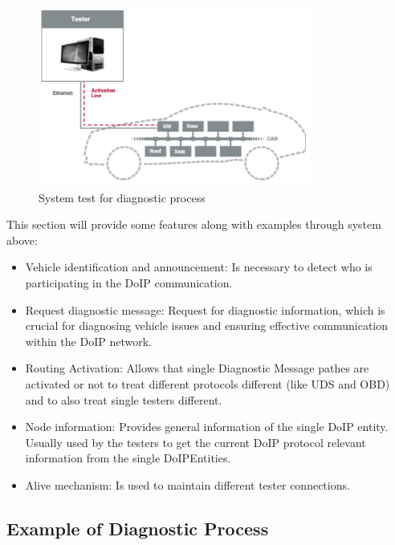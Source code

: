 \begin{figure}[htbp]
    \centering
    \includegraphics[width=0.8\textwidth]{./pictures/setup-system-test.png}
    \caption{System test for diagnostic process}
    \label{fig:2.3}
\end{figure}

This section will provide some features along with examples through system above:
\begin{itemize}

    \item Vehicle identification and announcement: Is necessary to detect who is participating in the DoIP communication.

    \item Request diagnostic message: Request for diagnostic information, which is crucial for diagnosing vehicle issues 
    and ensuring effective communication within the DoIP network.

    \item Routing Activation: Allows that single Diagnostic Message pathes are activated or not to treat different protocols 
    different (like UDS and OBD) and to also treat single testers different.
        
    \item Node information: Provides general information of the single DoIP entity. Usually used by the testers to get the
     current DoIP protocol relevant information from the single DoIPEntities.

    \item Alive mechanism: Is used to maintain different tester connections.

\end{itemize}

    \newpage
    \subsection{Example of Diagnostic Process}

